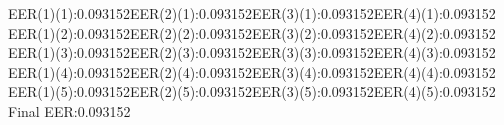 EER(1)(1):0.093152EER(2)(1):0.093152EER(3)(1):0.093152EER(4)(1):0.093152\\
EER(1)(2):0.093152EER(2)(2):0.093152EER(3)(2):0.093152EER(4)(2):0.093152\\
EER(1)(3):0.093152EER(2)(3):0.093152EER(3)(3):0.093152EER(4)(3):0.093152\\
EER(1)(4):0.093152EER(2)(4):0.093152EER(3)(4):0.093152EER(4)(4):0.093152\\
EER(1)(5):0.093152EER(2)(5):0.093152EER(3)(5):0.093152EER(4)(5):0.093152\\
Final EER:0.093152
